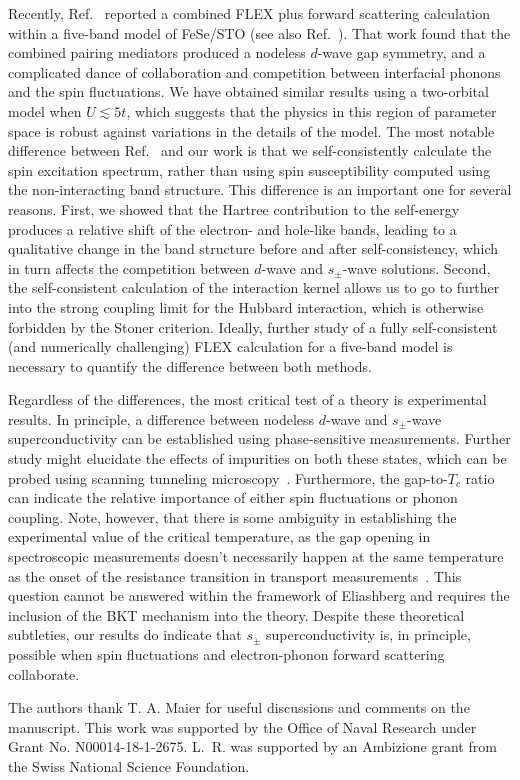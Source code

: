 \documentclass[%
 reprint,
 superscriptaddress,
nofootinbib,
nobibnotes,
 amsmath,amssymb,
 aps,
 prb,
 dvipsnames, 
 floatfix
]{revtex4-2}
\begin{document}
Recently, Ref.~\cite{Schrodi:2020bq} reported a combined FLEX plus forward scattering calculation within a five-band model of FeSe/STO (see also Ref.~\cite{Schrodi:2020bz}). That work found that the combined pairing mediators produced a nodeless $d$-wave gap symmetry, and a complicated dance of collaboration and competition between interfacial phonons and the spin fluctuations. We have obtained similar results using a two-orbital model when $U \lesssim 5t$, which suggests that the physics in this region of parameter space is robust against variations in the details of the model. The most notable difference between Ref.~\cite{Schrodi:2020bq} and our work is that we self-consistently calculate the spin excitation spectrum, rather than using spin susceptibility computed using the non-interacting band structure. This difference is an important one for several reasons. First, we showed that the Hartree contribution to the self-energy produces a relative shift of the electron- and hole-like bands, leading to a qualitative change in the band structure before and after self-consistency, which in turn affects the competition between $d$-wave and $s_\pm$-wave solutions. Second, the self-consistent calculation of the interaction kernel allows us to go to further into the strong coupling limit for the Hubbard interaction, which is otherwise forbidden by the Stoner criterion. Ideally, further study of a fully self-consistent (and numerically challenging) FLEX calculation for a five-band model is necessary to quantify the difference between both methods.

Regardless of the differences, the most critical test of a theory is experimental results. In principle, a difference between nodeless $d$-wave and $s_\pm$-wave superconductivity can be established using phase-sensitive measurements. Further study might elucidate the effects of impurities on both these states, which can be probed using scanning tunneling microscopy~\cite{Fan:2015dl, Zhang:2020fg}.  Furthermore, the gap-to-$T_c$ ratio can indicate the relative importance of either spin fluctuations or phonon coupling. Note, however, that there is some ambiguity in establishing the experimental value of the critical temperature, as the gap opening in spectroscopic measurements doesn't necessarily happen at the same temperature as the onset of the resistance transition in transport measurements~\cite{Faeth:2020un}. This question cannot be answered within the framework of Eliashberg and requires the inclusion of the BKT mechanism into the theory. Despite these theoretical subtleties, our results do indicate that $s_\pm$ superconductivity is, in principle, possible when spin fluctuations and electron-phonon forward scattering collaborate.

\begin{acknowledgments}
The authors thank T. A. Maier for useful discussions and comments on the manuscript. This work was supported by the Office of Naval Research under Grant No. N00014-18-1-2675. L.~R. was supported by an Ambizione grant from the Swiss National Science Foundation.
\end{acknowledgments}


\end{document}
